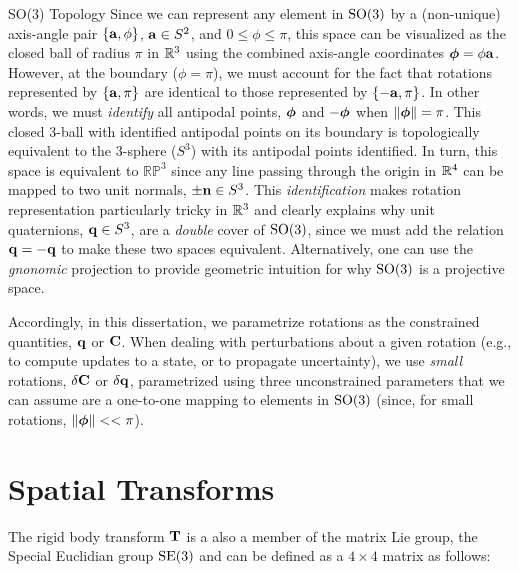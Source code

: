 \begin{remark}{SO(3) Topology}
Since we can represent any element in $\mathrm{SO}(3)$ by a (non-unique) axis-angle pair $\{\boldsymbol{\mathbf{a}}, \phi\}$, $\boldsymbol{\mathbf{a}} \in S^2$, and $0 \leq \phi \leq \pi$, this space can be visualized as the closed ball of radius $\pi$ in $\RealNumbers{}^3$ using the combined axis-angle coordinates $\boldsymbol{\mathbf{\phi}} = \phi \boldsymbol{\mathbf{a}}$. However, at the boundary ($\phi = \pi$), we must account for the fact that rotations represented by $\{\boldsymbol{\mathbf{a}}, \pi\}$ are identical to those represented by $\{-\boldsymbol{\mathbf{a}}, \pi\}$. In other words, we must \textit{identify} all antipodal points, $\boldsymbol{\mathbf{\phi}}$ and $-\boldsymbol{\mathbf{\phi}}$ when $\left\Vert\boldsymbol{\mathbf{\phi}}\right\Vert = \pi$. This closed 3-ball with identified antipodal points on its boundary is topologically equivalent to the 3-sphere ($S^3$) with its antipodal points identified. In turn, this space is equivalent to $\mathbb{RP}^3$ since any line passing through the origin in $\RealNumbers^4$ can be mapped to two unit normals, $\pm \boldsymbol{\mathbf{n}} \in S^3$.
This \textit{identification} makes rotation representation particularly tricky in $\RealNumbers{}^3$ and clearly explains why unit quaternions, $\boldsymbol{\mathbf{q}} \in S^3$, are a \textit{double} cover of  $\mathrm{SO}(3)$, since we must add the relation $\boldsymbol{\mathbf{q}} = -\boldsymbol{\mathbf{q}}$ to make these two spaces equivalent. Alternatively, one can use the \textit{gnonomic} projection \citep{Hartley2013-rc} to provide geometric intuition for why $\mathrm{SO}(3)$ is a projective space. 
\end{remark}
Accordingly, in this dissertation, we parametrize rotations as the constrained quantities, $\boldsymbol{\mathbf{q}}$ or $\boldsymbol{\mathbf{C}}$. When dealing with perturbations about a given rotation (e.g., to compute updates to a state, or to propagate uncertainty), we use \textit{small} rotations, $\delta \boldsymbol{\mathbf{C}}$ or $\delta \boldsymbol{\mathbf{q}}$, parametrized using three unconstrained parameters that we can assume are a one-to-one mapping to elements in $\mathrm{SO}(3)$  (since, for small rotations, $\left\Vert\boldsymbol{\mathbf{\phi}}\right\Vert << \pi$).

\section{Spatial Transforms}
The rigid body transform $\boldsymbol{\mathbf{T}}$ is a also a member of the matrix Lie group, the Special Euclidian group $\mathrm{SE}(3)$ and can be defined as a $4 \times 4$ matrix as follows:

